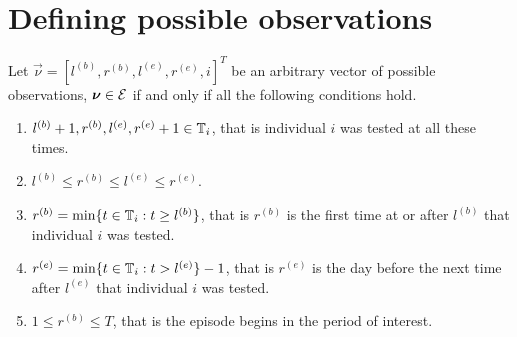 \documentclass[thesis.tex]{subfiles}
\begin{document}
\chapter{Defining possible observations} \label{perf-test:sec:conditions-nu-E}

Let $\vec{\nu} = [l^{(b)}, r^{(b)}, l^{(e)}, r^{(e)}, i]^T$ be an arbitrary vector of possible observations, $\bm{\nu} \in \mathcal{E}$ if and only if all the following conditions hold.
\begin{enumerate}
  \item $l^{(b)} + 1, r^{(b)}, l^{(e)}, r^{(e)} + 1 \in \mathbb{T}_{i}$, that is individual ${i}$ was tested at all these times.
  \item $l^{(b)} \leq r^{(b)} \leq l^{(e)} \leq r^{(e)}$.
  \item $r^{(b)} = \min\{t \in \mathbb{T}_{i} : t \geq l^{(b)}\}$, that is $r^{(b)}$ is the first time at or after $l^{(b)}$ that individual ${i}$ was tested.
  \item $r^{(e)} = \min\{t \in \mathbb{T}_{i} : t > l^{(e)}\} - 1$, that is $r^{(e)}$ is the day before the next time after $l^{(e)}$ that individual ${i}$ was tested.
  \item $1 \leq r^{(b)} \leq T$, that is the episode begins in the period of interest.
\end{enumerate}
\end{document}
